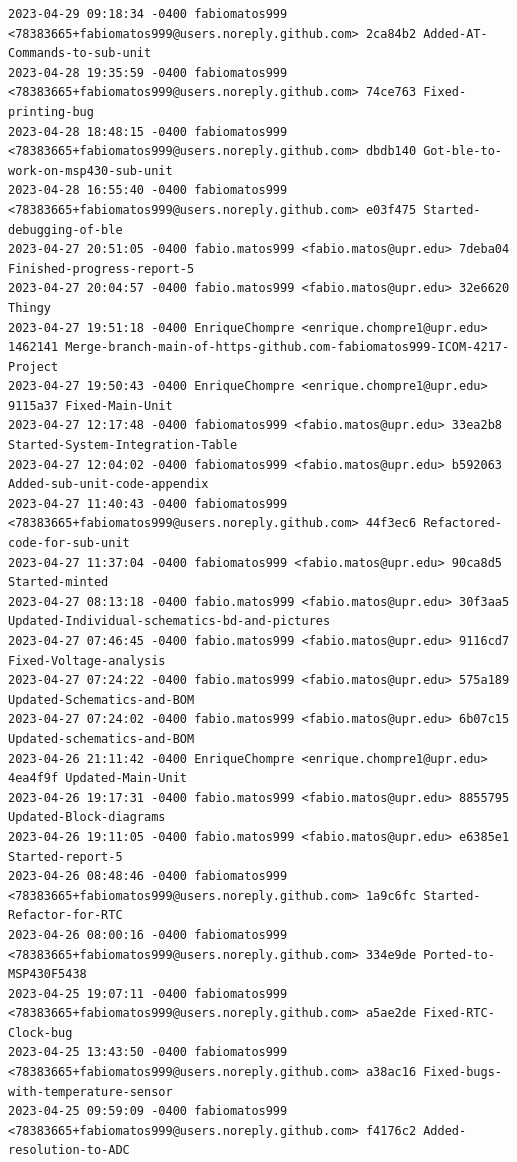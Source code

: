 \documentclass[12pt]{article}
\begin{document}
\begin{lstlisting}
2023-04-29 09:18:34 -0400 fabiomatos999 <78383665+fabiomatos999@users.noreply.github.com> 2ca84b2 Added-AT-Commands-to-sub-unit
2023-04-28 19:35:59 -0400 fabiomatos999 <78383665+fabiomatos999@users.noreply.github.com> 74ce763 Fixed-printing-bug
2023-04-28 18:48:15 -0400 fabiomatos999 <78383665+fabiomatos999@users.noreply.github.com> dbdb140 Got-ble-to-work-on-msp430-sub-unit
2023-04-28 16:55:40 -0400 fabiomatos999 <78383665+fabiomatos999@users.noreply.github.com> e03f475 Started-debugging-of-ble
2023-04-27 20:51:05 -0400 fabio.matos999 <fabio.matos@upr.edu> 7deba04 Finished-progress-report-5
2023-04-27 20:04:57 -0400 fabio.matos999 <fabio.matos@upr.edu> 32e6620 Thingy
2023-04-27 19:51:18 -0400 EnriqueChompre <enrique.chompre1@upr.edu> 1462141 Merge-branch-main-of-https-github.com-fabiomatos999-ICOM-4217-Project
2023-04-27 19:50:43 -0400 EnriqueChompre <enrique.chompre1@upr.edu> 9115a37 Fixed-Main-Unit
2023-04-27 12:17:48 -0400 fabiomatos999 <fabio.matos@upr.edu> 33ea2b8 Started-System-Integration-Table
2023-04-27 12:04:02 -0400 fabiomatos999 <fabio.matos@upr.edu> b592063 Added-sub-unit-code-appendix
2023-04-27 11:40:43 -0400 fabiomatos999 <78383665+fabiomatos999@users.noreply.github.com> 44f3ec6 Refactored-code-for-sub-unit
2023-04-27 11:37:04 -0400 fabiomatos999 <fabio.matos@upr.edu> 90ca8d5 Started-minted
2023-04-27 08:13:18 -0400 fabio.matos999 <fabio.matos@upr.edu> 30f3aa5 Updated-Individual-schematics-bd-and-pictures
2023-04-27 07:46:45 -0400 fabio.matos999 <fabio.matos@upr.edu> 9116cd7 Fixed-Voltage-analysis
2023-04-27 07:24:22 -0400 fabio.matos999 <fabio.matos@upr.edu> 575a189 Updated-Schematics-and-BOM
2023-04-27 07:24:02 -0400 fabio.matos999 <fabio.matos@upr.edu> 6b07c15 Updated-schematics-and-BOM
2023-04-26 21:11:42 -0400 EnriqueChompre <enrique.chompre1@upr.edu> 4ea4f9f Updated-Main-Unit
2023-04-26 19:17:31 -0400 fabio.matos999 <fabio.matos@upr.edu> 8855795 Updated-Block-diagrams
2023-04-26 19:11:05 -0400 fabio.matos999 <fabio.matos@upr.edu> e6385e1 Started-report-5
2023-04-26 08:48:46 -0400 fabiomatos999 <78383665+fabiomatos999@users.noreply.github.com> 1a9c6fc Started-Refactor-for-RTC
2023-04-26 08:00:16 -0400 fabiomatos999 <78383665+fabiomatos999@users.noreply.github.com> 334e9de Ported-to-MSP430F5438
2023-04-25 19:07:11 -0400 fabiomatos999 <78383665+fabiomatos999@users.noreply.github.com> a5ae2de Fixed-RTC-Clock-bug
2023-04-25 13:43:50 -0400 fabiomatos999 <78383665+fabiomatos999@users.noreply.github.com> a38ac16 Fixed-bugs-with-temperature-sensor
2023-04-25 09:59:09 -0400 fabiomatos999 <78383665+fabiomatos999@users.noreply.github.com> f4176c2 Added-resolution-to-ADC

\end{lstlisting}
\end{document}
